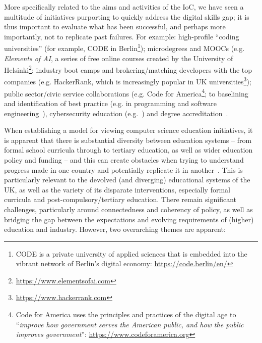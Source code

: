 \documentclass[conference]{IEEEtran}
\begin{document}
More specifically related to the aims and activities of the IoC, we
have seen a multitude of initiatives purporting to quickly address the
digital skills gap; it is thus important to evaluate what has been
successful, and perhaps more importantly, not to replicate past
failures. For example: high-profile ``coding universities'' (for
example, CODE in Berlin\footnote{CODE is a private university of
applied sciences that is embedded into the vibrant network of Berlin’s
digital economy: \url{https://code.berlin/en/}}); microdegrees and
MOOCs (e.g. {\emph{Elements of AI}}, a series of free online courses created by
the University of
Helsinki\footnote{\url{https://www.elementsofai.com}}; industry boot
camps and brokering/matching developers with the top companies
(e.g. HackerRank, which is increasingly popular in UK
universities\footnote{\url{https://www.hackerrank.com}}); public
sector/civic service collaborations (e.g. Code for
America\footnote{Code for America uses the principles and practices of
the digital age to ``{\emph{improve how government serves the American
public, and how the public improves government}}'':
\url{https://www.codeforamerica.org}}; to baselining and
identification of best practice (e.g. in programming and software
engineering~\cite{murphy-et-al:programming2017}), cybersecurity
education (e.g.~\cite{crick-et-al:fie2019, itnowcyber:2019}) and
degree accreditation~\cite{crick-et-al:cep2020,itnowaccred:2020}.

When establishing a model for viewing computer science education
initiatives, it is apparent that there is substantial diversity
between education systems -- from formal school curricula through to
tertiary education, as well as wider education policy and funding --
and this can create obstacles when trying to understand progress made
in one country and potentially replicate it in
another~\cite{hubwieser:2013,falkner-et-al:2019}. This is particularly
relevant to the devolved (and diverging) educational systems of the
UK, as well as the variety of its disparate interventions, especially
formal curricula and post-compulsory/tertiary education.  There remain
significant challenges, particularly around connectedness and
coherency of policy, as well as bridging the gap between the
expectations and evolving requirements of (higher) education and
industry. However, two overarching themes are apparent:
\end{document}
